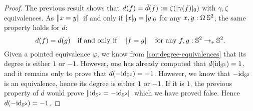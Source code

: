 \documentclass[english,a4]{article}
\newcommand{\ptdto}{\to_\ast}%
\newcommand{\settrunc}[1]{\trunc{#1}_0}
\begin{document}
\begin{proof}
  The previous result shows that 
  $d(f) = \bar d(f) \defeq \zeta(\settrunc{\gamma(f)})$ 
  with $\gamma, \zeta$ equivalences. As
  $\lVert x = y\rVert$ if and only if $\settrunc x = \settrunc y$ for any
  $x,y:\loopspace\null \Sp$, the same property holds for $d$:
  \begin{displaymath}
    d(f) = d(g) \quad \text{if and only if}\quad
    \Trunc{f = g} \quad \text{for any}\ f,g:\Sp \ptdto\Sp.
  \end{displaymath}
  Given a pointed equivalence $\varphi$, we know from
  \cref{cor:degree-equivalences} that its degree is either $1$ or $-1$.
  However, one has already computed that $d(\mathord{\mathrm{id}}_{{\mathbb S^{2}}}) = 1$, and it remains only
  to prove that $d(-\mathord{\mathrm{id}}_{{\mathbb S^{2}}}) = -1$. However, we know that $-\mathord{\mathrm{id}}_{{\mathbb S^{2}}}$ is an
  equivalence, hence its degree is either $1$ or $-1$. If it is $1$, the
  previous property of $d$ would prove $\lVert\mathord{\mathrm{id}}_{{\mathbb S^{2}}} = -\mathord{\mathrm{id}}_{{\mathbb S^{2}}}\rVert$ which we
  have proved false. Hence $d(-\mathord{\mathrm{id}}_{{\mathbb S^{2}}}) = -1$.
  

\end{proof}
\end{document}
